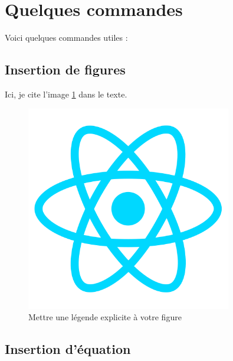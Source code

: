 \documentclass{rapportCS}
\begin{document}
\newpage







\section{Quelques commandes}

Voici quelques commandes utiles :



\subsection{Insertion de figures}
Ici, je cite l'image \ref{fig:my_label} dans le texte.
\begin{figure}[h!]
    \centering
    \includegraphics[width=0.8\textwidth]{logos/react.png}
    \caption{Mettre une légende explicite à votre figure}
    \label{fig:my_label}
\end{figure}

\subsection{Insertion d'équation}
\end{document}
